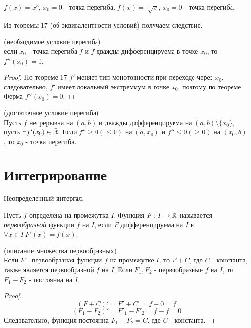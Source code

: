 \begin{example}
    $f(x) = x^3$, $x_0 = 0$ - точка перегиба.
    $f(x) = \sqrt[3]{x}$, $x_0 = 0$ - точка перегиба.
\end{example}

Из теоремы 17 (об эквивалентности условий) получаем следствие.\\
\begin{corollary} (необходимое условие перегиба)\\
    если $x_0$ - точка перегиба $f$ и $f$ дважды дифференцируема в точке $x_0$, то
    $f''(x_0) = 0$.
\end{corollary}

\begin{proof}
    По теореме 17 $f'$ меняет тип монотонности при переходе через $x_0$,
    следовательно, $f'$ имеет локальный экстреммум в точке $x_0$, поэтому
    по теореме Ферма $f''(x_0) = 0$.
\end{proof}

\begin{corollary} (достаточное условие перегиба)\\
    Пусть $f$ непрерывна на $(a, b)$ и дважды дифференцируема на $(a, b) \setminus \{x_0\}$,
    пусть $\exists f'(x_0) \in \bar{\mathbb{R}}$. Если $f'' \geq 0 (\leq 0)$ на $(a, x_0)$ и $f'' \leq 0 (\geq 0)$ на $(x_0, b)$
    , то $x_0$ - точка перегиба.
\end{corollary}

\section{Интегрирование}

Неопределенный интергал.

\begin{definition}
    Пусть $f$ определена на промежутка $I$. Функция $F: I \to \mathbb{R}$ называется \textit{первообразной}
    функции $f$ на $I$, если $F$ дифференцируема на $I$ и $\forall x \in I \ F'(x) = f(x)$.
\end{definition}

\begin{theorem} (описание множества первообразных)\\
    Если $F$ - первообразная функции $f$ на промежутке $I$, то $F+C$, где $C$ - константа,
    также является первообразной $f$ на $I$. Если $F_1, F_2$ - первообразные $f$ на $I$,
    то $F_1-F_2$ - постоянна на $I$.
\end{theorem}

\begin{proof}
    \[(F+C)' = F' + C' = f + 0 = f\]
    \[(F_1 - F_2)' = F'_1 - F'_2 = f - f = 0\]
    Следовательно, функция постоянна $F_1 - F_2 = C$, где $C$ - константа.
\end{proof}

